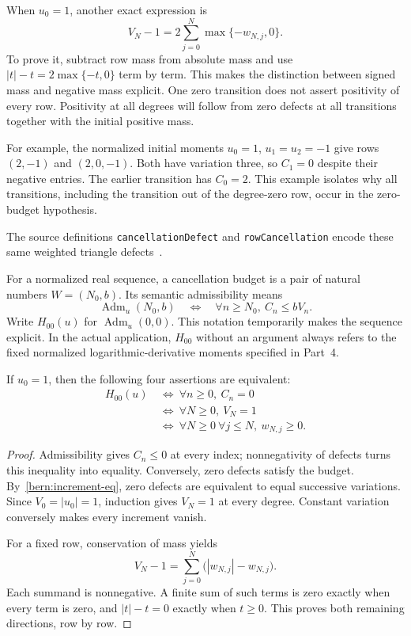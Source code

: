 When $u_0=1$, another exact expression is
\[
 V_N-1=2\sum_{j=0}^N\max\{-w_{N,j},0\}.
\]
To prove it, subtract row mass from absolute mass and use
$|t|-t=2\max\{-t,0\}$ term by term. This makes the distinction
between signed mass and negative mass explicit. One zero transition
does not assert positivity of every row. Positivity at all degrees
will follow from zero defects at all transitions together with the
initial positive mass.

For example, the normalized initial moments $u_0=1$, $u_1=u_2=-1$
give rows $(2,-1)$ and $(2,0,-1)$. Both have variation three, so
$C_1=0$ despite their negative entries. The earlier transition has
$C_0=2$. This example isolates why all transitions, including the
transition out of the degree-zero row, occur in the zero-budget
hypothesis.

The source definitions
\texttt{cancellationDefect} and \texttt{rowCancellation} encode these
same weighted triangle defects~\cite{source}.

\label{bern:zero-budget-page}

For a normalized real sequence, a cancellation budget is a pair of
natural numbers $W=(N_0,b)$. Its semantic admissibility means
\[
 \operatorname{Adm}_u(N_0,b)\quad\Longleftrightarrow\quad
 \forall n\ge N_0,\ C_n\le bV_n.
\]
Write $H_{00}(u)$ for $\operatorname{Adm}_u(0,0)$. This notation
temporarily makes the sequence explicit. In the actual application,
$H_{00}$ without an argument always refers to the fixed normalized
logarithmic-derivative moments specified in Part~4.

\begin{theorem}\label{bern:h00}
If $u_0=1$, then the following four assertions are equivalent:
\begin{equation}\label{bern:h00-equivalences}
 \begin{aligned}
 H_{00}(u)
 &\ \Longleftrightarrow\ \forall n\ge0,\ C_n=0\\
 &\ \Longleftrightarrow\ \forall N\ge0,\ V_N=1\\
 &\ \Longleftrightarrow\ \forall N\ge0\ \forall j\le N,\ w_{N,j}\ge0.
 \end{aligned}
\end{equation}
\end{theorem}
\begin{proof}
Admissibility gives $C_n\le0$ at every index; nonnegativity of defects
turns this inequality into equality. Conversely, zero defects satisfy
the budget. By~\eqref{bern:increment-eq}, zero defects are equivalent
to equal successive variations. Since $V_0=|u_0|=1$, induction gives
$V_N=1$ at every degree. Constant variation conversely makes every
increment vanish.

For a fixed row, conservation of mass yields
\[
 V_N-1=\sum_{j=0}^N\bigl(|w_{N,j}|-w_{N,j}\bigr).
\]
Each summand is nonnegative. A finite sum of such terms is zero
exactly when every term is zero, and $|t|-t=0$ exactly when $t\ge0$.
This proves both remaining directions, row by row.
\end{proof}

